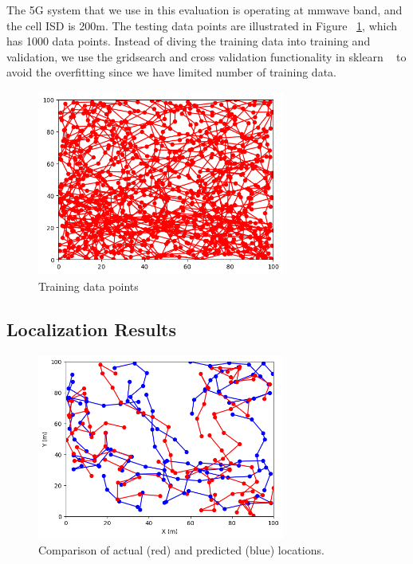 \documentclass[conference, 10pt]{IEEEtran}
\begin{document}
The 5G system that we use in this evaluation is operating at mmwave band, and the cell ISD is 200m. The testing data points are illustrated in 
Figure ~\ref{fig:training}, which has 1000 data points. Instead of diving the training data into training and validation, we use the gridsearch and cross validation functionality in 
sklearn ~\cite{sklearn} to avoid the overfitting since we have limited number of training data.

\begin{figure}[t]
	\begin{center}
	\includegraphics[height=2.4in,width=3.2in]{./GM_training.png}
	\caption{\label{fig:training}
	{\small Training data points}}
	\end{center}
	\end{figure}		

\subsection{Localization Results}


\begin{figure}[t]
\begin{center}
\includegraphics[height=2.4in,width=3.2in]{./Combined_path_illustration.png}
\caption{\label{fig:toyeg}
{\small Comparison of actual (red) and predicted (blue) locations.}}
\end{center}
\end{figure}
\end{document}
